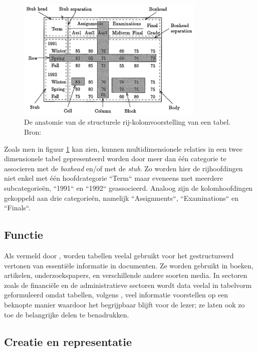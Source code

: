 \begin{figure}[H]
    \centering
    \includegraphics[width=0.8\textwidth]{img/tabel_anatomie.png}
    \caption{De anatomie van de structurele rij-kolomvoorstelling van een tabel. Bron: \cite{Wang1996}}
    \label{fig:tabel_anatomie}
\end{figure}

Zoals men in figuur \ref{fig:tabel_anatomie} kan zien, kunnen multidimensionele relaties in een twee dimensionele tabel gepresenteerd worden door meer dan één categorie te associeren met de \textit{boxhead} en/of met de \textit{stub}. Zo worden hier de rijhoofdingen niet enkel met één hoofdcategorie ``Term`` maar eveneens met meerdere subcategorieën, ``1991`` en ``1992`` geassocieerd. Analoog zijn de kolomhoofdingen gekoppeld aan drie categorieën, namelijk ``Assignments``, ``Examinations`` en ``Finals``.

\subsection{Functie}
\label{subsec:functie}

Als vermeld door \textcite{Shahzad2019}, worden tabellen veelal gebruikt voor het gestructureerd vertonen van essentiële informatie in documenten. Ze worden gebruikt in boeken, artikelen, onderzoekspapers, en verschillende andere soorten media. In sectoren zoals de financiële en de administratieve sectoren wordt data veelal in tabelvorm geformuleerd omdat tabellen, volgens \textcite{Coueasnon2014}, veel informatie voorstellen op een beknopte manier waardoor het begrijpbaar blijft voor de lezer; ze laten ook zo toe de belangrijke delen te benadrukken. 

\subsection{Creatie en representatie}
\label{subsec:creatie-en-representatie}

